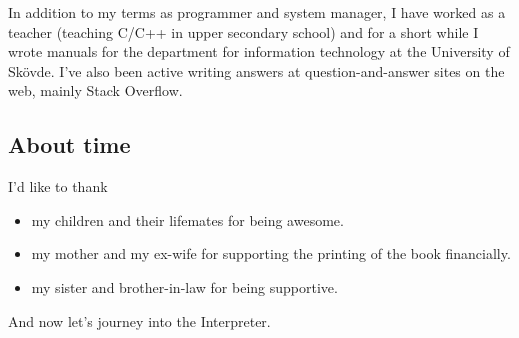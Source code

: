 \documentclass[a5paper,draft]{memoir}
\begin{document}
In addition to my terms as programmer and system manager, I have worked as a
teacher (teaching C/C++ in upper secondary school) and for a short while I
wrote manuals for the department for information technology at
the University of Skövde. I've also been active writing answers at
question-and-answer sites on the web, mainly Stack Overflow.

\subsection{About time}
\label{about-time}

I'd like to thank

\begin{itemize}
\item my children and their lifemates for being awesome.

\item my mother and my ex-wife for supporting the printing of the book financially.

\item my sister and brother-in-law for being supportive.
\end{itemize}

\vspace{1in}\noindent And now let's journey into the Interpreter.

\mainmatter
\pagestyle{headings}
\end{document}
